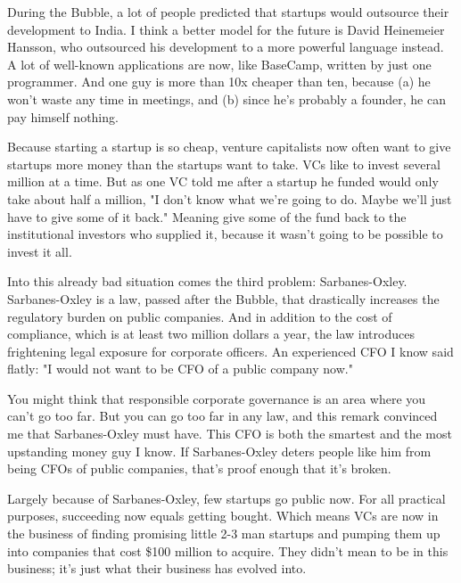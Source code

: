 During the
                  Bubble, a lot of people predicted that startups would
                  outsource their development to India. I think a better model
                  for the future is David Heinemeier Hansson, who outsourced his
                  development to a more powerful language instead. A lot of
                  well-known applications are now, like BaseCamp, written by
                  just one programmer. And one guy is more than 10x cheaper than
                  ten, because (a) he won't waste any time in meetings, and (b)
                  since he's probably a founder, he can pay himself nothing.

Because
                  starting a startup is so cheap, venture capitalists now often
                  want to give startups more money than the startups want to
                  take. VCs like to invest several million at a time. But as one
                  VC told me after a startup he funded would only take about
                  half a million, "I don't know what we're going to do. Maybe
                  we'll just have to give some of it back." Meaning give some of
                  the fund back to the institutional investors who supplied it,
                  because it wasn't going to be possible to invest it all.

Into
                  this already bad situation comes the third problem:
                  Sarbanes-Oxley. Sarbanes-Oxley is a law, passed after the
                  Bubble, that drastically increases the regulatory burden on
                  public companies. And in addition to the cost of compliance,
                  which is at least two million dollars a year, the law
                  introduces frightening legal exposure for corporate officers.
                  An experienced CFO I know said flatly: "I would not want to be
                  CFO of a public company now."

You might think that
                  responsible corporate governance is an area where you can't go
                  too far. But you can go too far in any law, and this remark
                  convinced me that Sarbanes-Oxley must have. This CFO is both
                  the smartest and the most upstanding money guy I know. If
                  Sarbanes-Oxley deters people like him from being CFOs of
                  public companies, that's proof enough that it's broken.

Largely
                  because of Sarbanes-Oxley, few startups go public now. For all
                  practical purposes, succeeding now equals getting bought.
                  Which means VCs are now in the business of finding promising
                  little 2-3 man startups and pumping them up into companies
                  that cost \$100 million to acquire. They didn't mean to be in
                  this business; it's just what their business has evolved
                  into.

